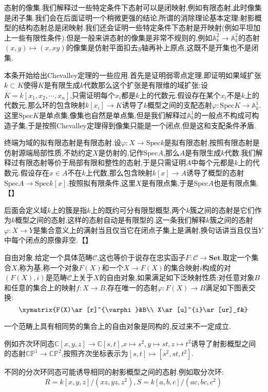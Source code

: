 态射的像集.我们解释过一些特定条件下态射可以是闭映射,例如有限态射,此时像集是闭子集.我们会在后面证明一个稍微更强的结论,所谓的消除理论基本定理:射影概型的结构态射总是闭映射.我们还会证明一些特定条件下态射是开映射(例如平坦加上一些有限性条件).但是一般来讲态射的像集是非常不规则的,例如$\mathbb{A}_k^2\to\mathbb{A}_k^2$的态射$(x,y)\mapsto(x,xy)$的像集是仿射平面扣去$y$轴再补上原点,这既不是开集也不是闭集.



\item 本条开始给出Chevalley定理的一些应用.首先是证明弱零点定理,即证明如果域扩张$k\subset K$使得$K$是有限生成$k$代数那么这个扩张是有限维的域扩张:设$K=k[x_1,x_2,\cdots,x_n]$,只需证明每个$x_i$都是$k$上的代数元.假设存在某个$x_i$不是$k$上的代数元,那么环的包含映射$k[x_i]\to K$诱导了$k$概型之间的支配态射$\varphi:\mathrm{Spec}K\to\mathbb{A}_k^1$.这里$\mathrm{Spec}K$是单点集,像集也自然是单点集,但是我们解释过$\mathbb{A}_k^1$的一般点不构成可构造子集,于是按照Chevalley定理得到像集只能是一个闭点,但是这和支配条件矛盾.
\item 终端为域的拟有限态射是有限态射.设$\varphi:X\to\mathrm{Spec}k$是拟有限态射,按照有限态射是仿射源端局部性质,不妨约定$X$是仿射的,记作$\mathrm{Spec}A$,那么$A$是有限生成$k$代数.我们解释过有限态射等价于局部有限和整性的态射,于是只需证明$A$中每个元都是$k$上的代数元.假设存在$x\in A$不在$k$上代数,那么包含映射$k[x]\to A$诱导了概型的态射$\mathrm{Spec}A\to\mathrm{Spec}k[x]$.按照拟有限条件,这里$X$是有限点集,于是$\mathrm{Spec}A$也是有限点集.【】
\item 后面会定义域$k$上的簇是指$k$上的既约可分有限型概型,两个$k$簇之间的态射是它们作为$k$概型之间的态射.这样的态射自动是有限型的.这一条我们解释$k$簇之间的态射$\varphi:X\to Y$是集合意义上的满射当且仅当它在闭点子集上是满射,换句话讲当且仅当$Y$中每个闭点的原像非空.【】

自由对象.给定一个具体范畴$\mathscr{C}$,这也等价于说存在忠实函子$F:\mathscr{C}\to\textbf{Set}$.取定一个集合$X$,称为基,称一个对象$F(X)$和一个$X\to F(X)$的集合映射$i$构成的对$(F(X),i)$是范畴$\mathscr{C}$上关于$X$的自由对象,如果满足如下泛映射性质:对任意对象$B$和任意的集合上的映射$f:X\to B$,存在唯一的态射$\varphi:F(X)\to B$满足如下图表交换:
$$\xymatrix{F(X)\ar[r]^{\varphi}&B\\
	X\ar[u]^{i}\ar[ur]_f&}$$

一个范畴上具有相同势的集合上的自由对象是同构的,反过来不一定成立.


\item 例如齐次环同态$\mathbb{C}[x,y,z]\to\mathbb{C}[s,t]$,$x\mapsto s^2,y\mapsto st,z\mapsto t^2$诱导了射影概型之间的态射$\mathbb{CP}^1\to\mathbb{CP}^2$,按照齐次坐标表示为$[s,t]\mapsto[s^2,st,t^2]$.
\item 不同的分次环同态可能诱导相同的射影概型之间的态射.例如取分次环:
$$R=k[x,y,z]/(xz,yz,z^2),S=k[a,b,c]/(ac,bc,c^2)$$

